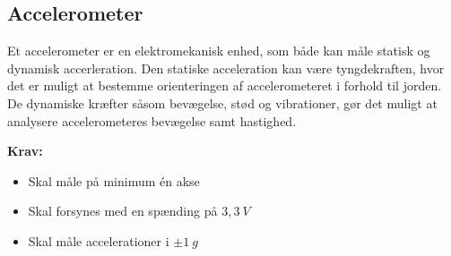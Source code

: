 \subsection{Accelerometer}
Et accelerometer er en elektromekanisk enhed, som både kan måle statisk og dynamisk accerleration. Den statiske acceleration kan være tyngdekraften, hvor det er muligt at bestemme orienteringen af accelerometeret i forhold til jorden. De dynamiske kræfter såsom bevægelse, stød og vibrationer, gør det muligt at analysere accelerometeres bevægelse samt hastighed. 
\vspace{3mm}

\textbf{Krav:}
\begin{itemize}
\item Skal måle på minimum én akse
\item Skal forsynes med en spænding på $3,3~V$
\item Skal måle accelerationer i $\pm1~g$
\end{itemize}
